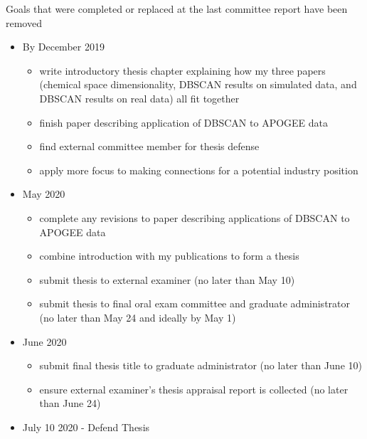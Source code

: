 \documentclass[11pt]{article}
\begin{document}
Goals that were completed or replaced at the last committee report have been removed

\begin{itemize}

\item By December 2019
\begin{itemize}
\item {\color{ForestGreen} write introductory thesis chapter explaining how my three papers (chemical space dimensionality, DBSCAN results on simulated data, and DBSCAN results on real data) all fit together}
\item {\color{RoyalBlue}finish paper describing application of DBSCAN to APOGEE data}
\item {\color{RoyalBlue} find external committee member for thesis defense}
\item {\color{ForestGreen} apply more focus to making connections for a potential industry position}
\end{itemize}
\item May 2020
\begin{itemize}
\item {complete any revisions to paper describing applications of DBSCAN to APOGEE data}
\item {\color{ForestGreen} combine introduction with my publications to form a thesis}
\item {submit thesis to external examiner (no later than May 10)}
\item submit thesis to final oral exam committee and graduate administrator (no later than May 24 and ideally by May 1)
\end{itemize}
\item June 2020
\begin{itemize}
\item submit final thesis title to graduate administrator (no later than June 10)
\item ensure external examiner's thesis appraisal report is collected (no later than June 24) 
\end{itemize}
\item July 10 2020 - Defend Thesis
\end{itemize}



\end{document}
